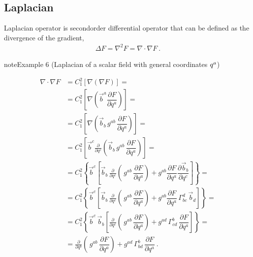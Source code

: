 \documentclass[letterpaper,10pt,english]{jupyterBook}
\begin{document}
\subsection{Laplacian}
\label{\detokenize{ch/tensor-algebra-calculus/calculus-euclidean:laplacian}}\label{\detokenize{ch/tensor-algebra-calculus/calculus-euclidean:tensor-calculus-differential-operators-laplacian}}
\sphinxAtStartPar
Laplacian operator is second\sphinxhyphen{}order differential operator that can be defined as the divergence of the gradient,
\begin{equation*}
\begin{split}\Delta F = \nabla^2 F = \nabla \cdot \nabla F \ .\end{split}
\end{equation*}\label{ch/tensor-algebra-calculus/calculus-euclidean:example-9}
\begin{sphinxadmonition}{note}{Example 6 (Laplacian of a scalar field \sphinxhyphen{} with general coordinates \protect\(q^a\protect\))}


\begin{equation*}
\begin{split}
\nabla \cdot \nabla F
  & = C_{1}^2 \left[ \nabla \left( \nabla F \right) \right] = \\
  & = C_{1}^2 \left[ \nabla \left( \vec{b}^a \dfrac{\partial F}{\partial q^a} \right) \right] = \\
  & = C_{1}^2 \left[ \nabla \left( \vec{b}_b \, g^{ab} \, \dfrac{\partial F}{\partial q^a} \right) \right] = \\
  & = C_{1}^2 \left[ \vec{b}^c \frac{\partial}{\partial q^c} \left( \vec{b}_b \, g^{ab} \, \dfrac{\partial F}{\partial q^a} \right) \right] = \\
  & = C_{1}^2 \left\{ \vec{b}^c \left[ \vec{b}_b \, \frac{\partial}{\partial q^c} \left( \, g^{ab} \, \dfrac{\partial F}{\partial q^a} \right) + g^{ab} \dfrac{\partial F}{\partial q^a} \dfrac{\partial \vec{b}_b}{\partial q^c} \right] \right\} = \\
  & = C_{1}^2 \left\{ \vec{b}^c \left[ \vec{b}_b \, \frac{\partial}{\partial q^c} \left( \, g^{ab} \, \dfrac{\partial F}{\partial q^a} \right) + g^{ab} \dfrac{\partial F}{\partial q^a} \, \Gamma_{bc}^d \, \vec{b}_d \right] \right \} = \\
  & = C_{1}^2 \left\{ \vec{b}^c \, \vec{b}_b \left[ \frac{\partial}{\partial q^c} \left( \, g^{ab} \, \dfrac{\partial F}{\partial q^a} \right) + g^{ad} \, \Gamma_{cd}^b \, \dfrac{\partial F}{\partial q^a} \right] \right \} = \\
  & = \frac{\partial}{\partial q^b} \left( \, g^{ab} \, \dfrac{\partial F}{\partial q^a} \right) + g^{ad} \, \Gamma_{bd}^b \, \dfrac{\partial F}{\partial q^a} \ .
\end{split}
\end{equation*}\end{sphinxadmonition}
\end{document}

